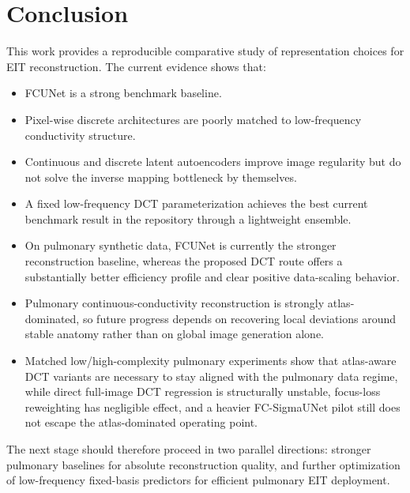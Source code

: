 \documentclass[11pt,a4paper]{article}
\begin{document}
\section{Conclusion}
This work provides a reproducible comparative study of representation choices for EIT reconstruction. The current evidence shows that:
\begin{itemize}[leftmargin=1.5em]
    \item FCUNet is a strong benchmark baseline.
    \item Pixel-wise discrete architectures are poorly matched to low-frequency conductivity structure.
    \item Continuous and discrete latent autoencoders improve image regularity but do not solve the inverse mapping bottleneck by themselves.
    \item A fixed low-frequency DCT parameterization achieves the best current benchmark result in the repository through a lightweight ensemble.
    \item On pulmonary synthetic data, FCUNet is currently the stronger reconstruction baseline, whereas the proposed DCT route offers a substantially better efficiency profile and clear positive data-scaling behavior.
    \item Pulmonary continuous-conductivity reconstruction is strongly atlas-dominated, so future progress depends on recovering local deviations around stable anatomy rather than on global image generation alone.
    \item Matched low/high-complexity pulmonary experiments show that atlas-aware DCT variants are necessary to stay aligned with the pulmonary data regime, while direct full-image DCT regression is structurally unstable, focus-loss reweighting has negligible effect, and a heavier FC-SigmaUNet pilot still does not escape the atlas-dominated operating point.
\end{itemize}

The next stage should therefore proceed in two parallel directions: stronger pulmonary baselines for absolute reconstruction quality, and further optimization of low-frequency fixed-basis predictors for efficient pulmonary EIT deployment.



\end{document}
